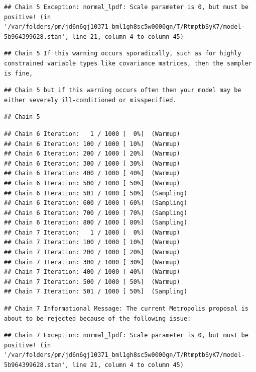 \documentclass[
]{book}
\begin{document}
\begin{verbatim}
## Chain 5 Exception: normal_lpdf: Scale parameter is 0, but must be positive! (in '/var/folders/pm/jd6n6gj10371_bml1gh8sc5w0000gn/T/RtmptbSyK7/model-5b964399628.stan', line 21, column 4 to column 45)
\end{verbatim}

\begin{verbatim}
## Chain 5 If this warning occurs sporadically, such as for highly constrained variable types like covariance matrices, then the sampler is fine,
\end{verbatim}

\begin{verbatim}
## Chain 5 but if this warning occurs often then your model may be either severely ill-conditioned or misspecified.
\end{verbatim}

\begin{verbatim}
## Chain 5
\end{verbatim}

\begin{verbatim}
## Chain 6 Iteration:   1 / 1000 [  0%]  (Warmup) 
## Chain 6 Iteration: 100 / 1000 [ 10%]  (Warmup) 
## Chain 6 Iteration: 200 / 1000 [ 20%]  (Warmup) 
## Chain 6 Iteration: 300 / 1000 [ 30%]  (Warmup) 
## Chain 6 Iteration: 400 / 1000 [ 40%]  (Warmup) 
## Chain 6 Iteration: 500 / 1000 [ 50%]  (Warmup) 
## Chain 6 Iteration: 501 / 1000 [ 50%]  (Sampling) 
## Chain 6 Iteration: 600 / 1000 [ 60%]  (Sampling) 
## Chain 6 Iteration: 700 / 1000 [ 70%]  (Sampling) 
## Chain 6 Iteration: 800 / 1000 [ 80%]  (Sampling) 
## Chain 7 Iteration:   1 / 1000 [  0%]  (Warmup) 
## Chain 7 Iteration: 100 / 1000 [ 10%]  (Warmup) 
## Chain 7 Iteration: 200 / 1000 [ 20%]  (Warmup) 
## Chain 7 Iteration: 300 / 1000 [ 30%]  (Warmup) 
## Chain 7 Iteration: 400 / 1000 [ 40%]  (Warmup) 
## Chain 7 Iteration: 500 / 1000 [ 50%]  (Warmup) 
## Chain 7 Iteration: 501 / 1000 [ 50%]  (Sampling)
\end{verbatim}

\begin{verbatim}
## Chain 7 Informational Message: The current Metropolis proposal is about to be rejected because of the following issue:
\end{verbatim}

\begin{verbatim}
## Chain 7 Exception: normal_lpdf: Scale parameter is 0, but must be positive! (in '/var/folders/pm/jd6n6gj10371_bml1gh8sc5w0000gn/T/RtmptbSyK7/model-5b964399628.stan', line 21, column 4 to column 45)
\end{verbatim}
\end{document}
